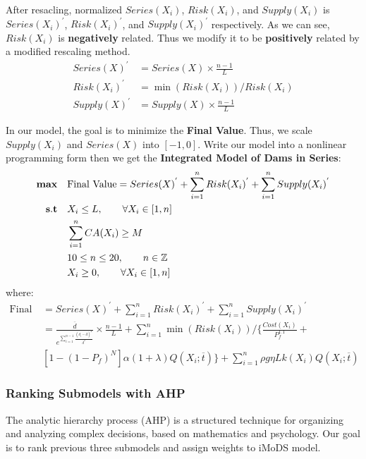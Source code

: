 \documentclass{mcmthesis}
\begin{document}
After resacling, normalized $Series(X_i)$, $Risk(X_i)$, and $Supply(X_i)$ is  $Series(X_i)^{'}$, $Risk(X_i)^{'}$, and $Supply(X_i)^{'}$ respectively. As we can see, $Risk(X_i)$ is \textbf{negatively} related. Thus we modify it to be \textbf{positively} related by a modified rescaling method.
\begin{align*}
Series(X)^{'} &= Series(X) \times \frac{n-1}{L}\\
Risk(X_i)^{'} &= \min(Risk(X_i))/ Risk(X_i)\\
Supply(X)^{'} &= Supply(X) \times \frac{n-1}{L}
\end{align*}

In our model, the goal is to minimize the \textbf{Final Value}. Thus, we scale $Supply(X_i)$ and $Series(X)$ into $[-1,0]$. Write our model into a nonlinear programming form then we get the \textbf{Integrated Model of Dams in Series}:
\begin{equation*}
\begin{split}
 {\bf max}\quad &\text{Final Value}  = Series(X)^{'} + \sum_{i=1}^{n}{Risk(X_i)^{'}} + \sum_{i=1}^{n}{Supply(X_i)^{'}}\\
  {\bf s.t}\quad  &X_i \le L, \qquad \forall X_i \in [1,n]\\
	& \sum_{i=1}^{n}{CA(X_i)}\ge M\\
     	& 10\le n\le 20, \qquad n \in \mathbb{Z} \\
	& X_i \ge 0, \qquad \forall X_i \in [1,n]\\
\end{split}
\end{equation*}
where:
\begin{align*}
\text{Final Value} & = Series(X)^{'} + \sum_{i=1}^{n}{Risk(X_i)^{'}} + \sum_{i=1}^{n}{Supply(X_i)^{'}}\\
& = \frac{\overline{d}}{e^{\sum_{i=1}^{n-1}\frac{(d_i-\overline{d})^2}{\overline{d}^2}}}\times \frac{n-1}{L} + \sum_{i=1}^{n}\min(Risk(X_i))/\{\frac{Cost(X_i)}{P_f^{1.1}}+ \\
&[1-(1-P_f)^N]\alpha(1+\lambda)Q(X_i;\overline{t})\}+ \sum_{i=1}^{n}{\rho g \eta L k(X_i)Q(X_i;\overline{t})}
\end{align*}
\subsubsection{Ranking Submodels with AHP}
The analytic hierarchy process (AHP) is a structured technique for organizing and analyzing complex decisions, based on mathematics and psychology. Our goal is to rank previous three submodels and assign weights to iMoDS model.
\end{document}
